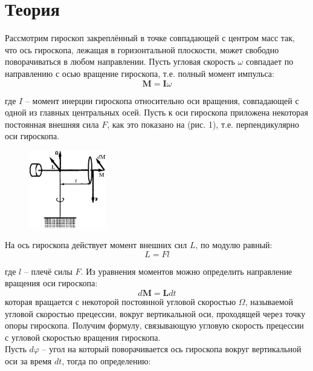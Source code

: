 \documentclass[a4paper]{article}
\begin{document}
\section{\textbf{Теория}}

Рассмотрим гироскоп закреплённый в точке совпадающей с центром масс так, что ось гироскопа, лежащая в горизонтальной
плоскости, может свободно поворачиваться в любом направлении. Пусть угловая скорость $\omega$ совпадает по направлению с осью вращение гироскопа, т.е. полный момент импульса:
\begin{equation}
\mathbf{M} = \mathbf{I} \omega
\end{equation}

где $I$ – момент инерции гироскопа относительно оси вращения,
совпадающей с одной из главных центральных осей. Пусть к оси
гироскопа приложена некоторая постоянная внешняя сила $F$, как
это показано на (рис. 1), т.е. перпендикулярно оси гироскопа.

\begin{figure}[H]
\begin{center}
\includegraphics[width=0.3\textwidth]{pick_1.png}
\end{center}
\end{figure}

На ось гироскопа действует момент внешних сил $L$, по модулю равный:
\begin{equation}
L=Fl
\end{equation}

где $l$ – плечё силы $F$. Из уравнения моментов можно определить
направление вращения оси гироскопа:
\begin{equation}
    d \mathbf{M}=\mathbf{L} d t
\end{equation}
которая вращается с некоторой постоянной угловой скоростью $\Omega$,
называемой угловой скоростью прецессии, вокруг вертикальной
оси, проходящей через точку опоры гироскопа. Получим формулу, связывающую угловую скорость прецессии с угловой скоростью вращения гироскопа.\\
Пусть $d \varphi$ – угол на который поворачивается ось гироскопа вокруг вертикальной оси за время $d t$, тогда по определению:
\end{document}
